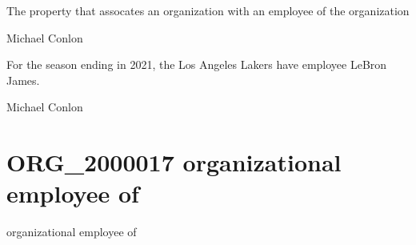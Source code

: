 \documentclass[letterpaper,10pt,english]{sphinxmanual}
\begin{document}
\begin{sphinxShadowBox}

\sphinxAtStartPar
The property that assocates an organization with an employee of the organization
\end{sphinxShadowBox}

\begin{sphinxShadowBox}

\sphinxAtStartPar
Michael Conlon 
\end{sphinxShadowBox}

\begin{sphinxShadowBox}

\sphinxAtStartPar
For the season ending in 2021, the Los Angeles Lakers have employee LeBron James.
\end{sphinxShadowBox}

\begin{sphinxShadowBox}

\sphinxAtStartPar
{}
\end{sphinxShadowBox}

\begin{sphinxShadowBox}

\sphinxAtStartPar
Michael Conlon 
\end{sphinxShadowBox}
\begin{quote}
\label{\detokenize{doc-ORG_2000017:org-2000017}}\label{\detokenize{doc-ORG_2000017:organizational-employee-of}}\label{\detokenize{doc-ORG_2000017:org-2000017}}
\ignorespaces \end{quote}


\section{ORG\_2000017 \sphinxhyphen{} organizational employee of}
\label{\detokenize{doc-ORG_2000017:org-2000017-organizational-employee-of}}\label{\detokenize{doc-ORG_2000017:index-0}}\label{\detokenize{doc-ORG_2000017::doc}}
\begin{sphinxShadowBox}

\sphinxAtStartPar
organizational employee of
\end{sphinxShadowBox}
\end{document}
